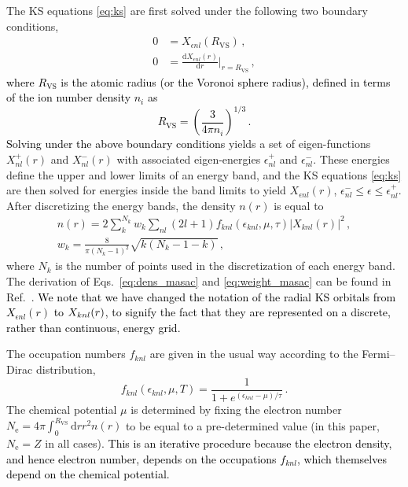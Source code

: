 \documentclass[%
 preprint,
 superscriptaddress,
 amsmath,amssymb,
longbibliography,
]{revtex4-2}
\newcommand{\RWS}{R_\textrm{VS}}
\newcommand{\T}{\tau}
\newcommand{\change}[1]{\textcolor{black}{#1}}
\newcommand{\RVS}{R_\textrm{VS}}
\begin{document}
The KS equations \eqref{eq:ks} are first solved under the following two boundary conditions,
\begin{align}
0&=X_{\epsilon nl}(\RWS)\,, \label{eq:bc_dir}\\
0&=\frac{\textrm{d}X_{\epsilon nl}(r)}{\textrm{d}r}\Bigg|_{r=\RWS}\, \label{eq:bc_neu},
\end{align}
\change{where $\RVS$ is the atomic radius (or the Voronoi sphere radius), defined in terms of the ion number density $n_i$ as
\begin{equation}
    \RWS = \left(\frac{3}{4\pi n_i}\right)^{1/3}\,.
\end{equation}
Solving under the above boundary conditions} yields a set of eigen-functions $X^+_{nl}(r)$ and $X^-_{nl}(r)$ with associated eigen-energies $\epsilon_{nl}^+$ and $\epsilon_{nl}^-$. These energies define the upper and lower limits of an energy band, and the KS equations \eqref{eq:ks} are then solved for energies inside the band limits to yield $X_{\epsilon nl}(r)$, $\epsilon^-_{nl}\leq\epsilon\leq\epsilon^+_{nl}$. After discretizing the energy bands, the density $n(r)$ is equal to
\begin{gather} \label{eq:dens_masac}
n(r) = 2\sum_{k}^{N_k} w_k \sum_{nl}(2l+1) f_{knl}(\epsilon_{knl},\mu,\T) |X_{knl}(r)|^2\,,\\
w_k = \frac{8}{\pi(N_k-1)^2}\sqrt{k(N_k-1-k)}\,, \label{eq:weight_masac}
\end{gather}
where $N_k$ is the number of points used in the discretization of each energy band. The derivation of Eqs.~\eqref{eq:dens_masac} and \eqref{eq:weight_masac} can be found in Ref.~\cite{Callow_MIS}. \change{We note that we have changed the notation of the radial KS orbitals from $X_{\epsilon nl} (r)$ to $\rnl$, to signify the fact that they are represented on a discrete, rather than continuous, energy grid.}

The occupation numbers $f_{knl}$ are given in the usual way according to the Fermi--Dirac distribution,
\begin{equation}
f_{knl}(\epsilon_{knl},\mu,T) = \frac{1}{1+e^{(\epsilon_{knl}-\mu)/\T}}\,.
\end{equation}
The chemical potential \(\mu\) is determined by fixing the electron
number \(N_\textrm{e}=4\pi\int_0^{\RWS} \textrm{d}r r^2 n(r)\) to be equal to a
pre-determined value (in this paper, \(N_\textrm{e}=Z\) in all cases). \change{This is an iterative procedure because the electron density, and hence electron number, depends on the occupations $f_{knl}$, which themselves depend on the chemical potential.}
\end{document}
